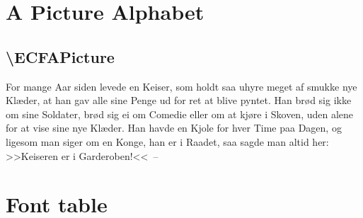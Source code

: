\documentclass[danish,a4paper,11pt]{scrartcl}
\begin{document}
\section*{A Picture Alphabet}
\subsection*{\textbackslash ECFAPicture}
\normalfont\ECFAPicture
  For mange Aar siden levede en Keiser, som holdt saa uhyre meget af
   smukke nye Kl\ae der, at han gav alle sine Penge ud for ret at blive
   pyntet. Han br\o d sig ikke om sine Soldater, br\o d sig ei om
   Comedie eller om at kj\o re i Skoven, uden alene for at vise sine
   nye Kl\ae der. Han havde en Kjole for hver Time paa Dagen, og
   ligesom man siger om en Konge, han er i Raadet, saa sagde man altid
   her: >>Keiseren er i Garderoben!<<~--

\newpage
\normalfont\ECFAPicture
\section*{Font table}
 \def\tfont{\usefont{T1}{fve}{m}{n}\selectfont}
 \newcount\currchar
 \def\showchar{\makebox[.09\linewidth]{\strut\char\currchar\hfill\tfont\tiny\the\currchar}
   \global\advance\currchar1}
 
\end{document}
